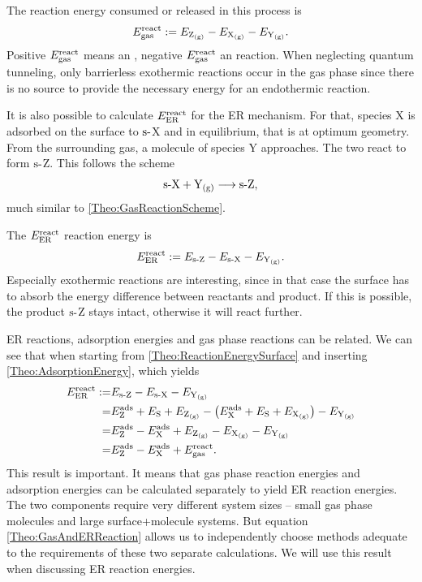 \documentclass[8.5pt,twoside,twocolumn]{article}
\newcommand\eads{\enmat{E^{\te{ads}}}}
\newcommand\ere{\enmat{E^{\te{react}}}}
\newcommand\sur{\enmat{\te{s-}}}
\newcommand\gas{\enmat{_\te{(g)}}}
\theoremstyle{standard}
\begin{document}
The reaction energy consumed or released in this process is
\begin{equation}
 \ere_{\te{gas}}:= E_{\Z\gas} - E_{\X\gas} - E_{\Y\gas}.
 \label{Theo:ReactionEnergyGas}
\end{equation}
Positive $\ere_{\te{gas}}$ means an , negative $\ere_{\te{gas}}$ 
an  reaction. When neglecting quantum tunneling, only barrierless
exothermic reactions occur in the gas phase since there is no source to provide
the necessary energy for an endothermic reaction.

It is also possible to calculate  $\ere_{\te{ER}}$ for the ER mechanism. For that,
species X is adsorbed on the surface to $\sur$X and in equilibrium, that is at optimum
geometry. From the surrounding gas, a molecule of species Y approaches. The two react
to form $\sur$Z. This follows the scheme
\begin{equation}
 \sur\X+\Y\gas \chemar  \sur\Z,
 \label{Theo:SurfaceReactionScheme}
\end{equation} 
much similar to \eqref{Theo:GasReactionScheme}.

The $\ere_{\te{ER}}$ reaction energy is
\begin{equation}
 \ere_{\te{ER}}:= E_{\sur\Z} - E_{\sur\X} - E_{\Y\gas}.
 \label{Theo:ReactionEnergySurface}
\end{equation}
Especially exothermic reactions are interesting, since in that case the surface has to absorb the 
energy difference between reactants and product. If this is possible, the product $\sur$Z
stays intact, otherwise it will react further.

ER reactions, adsorption energies and gas phase reactions can be related. We can see
that when starting from \eqref{Theo:ReactionEnergySurface} and inserting
\eqref{Theo:AdsorptionEnergy}, which yields
\begin{equation}
 \begin{aligned}
   \ere_{\te{ER}}:=& E_{\sur\Z} - E_{\sur\X} - E_{\Y\gas}\\
   =& \eads_{\Z}+E_\S + E_{\Z\gas} - \rb{\eads_{\X} +E_\S + E_{\X\gas}} - E_{\Y\gas}\\
   =& \eads_{\Z}-\eads_{\X} + E_{\Z\gas} - E_{\X\gas} - E_{\Y\gas}\\
   =& \eads_{\Z}-\eads_{\X} + \ere_{\te{gas}}.
 \end{aligned}
 \label{Theo:GasAndERReaction}
\end{equation}
This result is important. It means that gas phase reaction energies and adsorption energies can be
calculated separately to yield ER reaction energies. The two components require very
different system sizes -- small gas phase molecules and large surface+molecule systems. But
equation \eqref{Theo:GasAndERReaction} allows us to independently choose methods adequate
to the requirements of these two separate calculations. We will use this result when
discussing ER reaction energies. 
\end{document}
